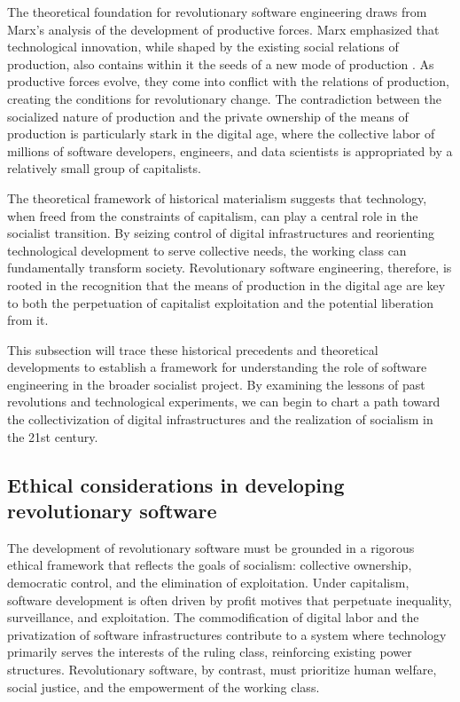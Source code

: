 \begin{refsection}
The theoretical foundation for revolutionary software engineering draws from Marx’s analysis of the development of productive forces. Marx emphasized that technological innovation, while shaped by the existing social relations of production, also contains within it the seeds of a new mode of production \cite[pp.~503]{marx1973grundrisse}. As productive forces evolve, they come into conflict with the relations of production, creating the conditions for revolutionary change. The contradiction between the socialized nature of production and the private ownership of the means of production is particularly stark in the digital age, where the collective labor of millions of software developers, engineers, and data scientists is appropriated by a relatively small group of capitalists.

The theoretical framework of historical materialism suggests that technology, when freed from the constraints of capitalism, can play a central role in the socialist transition. By seizing control of digital infrastructures and reorienting technological development to serve collective needs, the working class can fundamentally transform society. Revolutionary software engineering, therefore, is rooted in the recognition that the means of production in the digital age are key to both the perpetuation of capitalist exploitation and the potential liberation from it.

This subsection will trace these historical precedents and theoretical developments to establish a framework for understanding the role of software engineering in the broader socialist project. By examining the lessons of past revolutions and technological experiments, we can begin to chart a path toward the collectivization of digital infrastructures and the realization of socialism in the 21st century.

\subsection{Ethical considerations in developing revolutionary software}

The development of revolutionary software must be grounded in a rigorous ethical framework that reflects the goals of socialism: collective ownership, democratic control, and the elimination of exploitation. Under capitalism, software development is often driven by profit motives that perpetuate inequality, surveillance, and exploitation. The commodification of digital labor and the privatization of software infrastructures contribute to a system where technology primarily serves the interests of the ruling class, reinforcing existing power structures. Revolutionary software, by contrast, must prioritize human welfare, social justice, and the empowerment of the working class.


\end{refsection}
